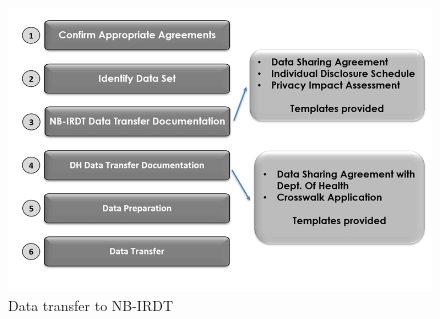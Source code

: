 \documentclass[
]{WileySix}
\begin{document}
\begin{figure}
\includegraphics[width=1\linewidth]{./assets/nbirdt/nbirdtfigure1web} \caption{Data transfer to NB-IRDT}\label{fig:nbirdtfigure1}
\end{figure}
\end{document}
